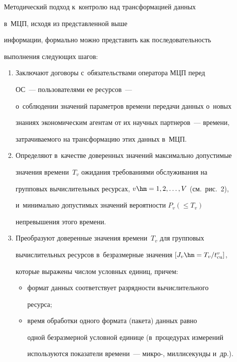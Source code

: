   

  Методический подход к~контролю над трансформацией данных 

в~МЦП, исходя из пред\-став\-лен\-ной выше 

информации, формально мож\-но пред\-ста\-вить как по\-сле\-до\-ва\-тель\-ность 

выполнения сле\-ду\-ющих ша\-гов:

  \begin{enumerate}[1.]

\item Заключают договоры с~обязательствами оператора МЦП перед 

ОС~--- пользователями ее ресурсов~--- 

о~соблюдении значений па\-ра\-мет\-ров времени передачи данных о~новых 

знаниях экономическим агентам от их научных партнеров~--- времени, 

за\-тра\-чи\-ва\-емо\-го на трансформацию этих данных в~МЦП.

\item Определяют в~качестве доверенных значений максимально до\-пус\-ти\-мые 

значения времени~$T_v$ ожидания требованиями обслуживания на 

групповых вы\-чис\-ли\-тель\-ных ресурсах, $v\hm=1, 2, \ldots, V$ (см.\ рис.~2), 

и~минимально до\-пус\-ти\-мых значений ве\-ро\-ят\-ности $P_v(\leq T_v)$ 

непревышения этого вре\-мени.

\item Преобразуют доверенные значения времени~$T_v$ для групповых 

вы\-чис\-ли\-тель\-ных ресурсов в~без\-раз\-мер\-ные значения $[J_v \hm= T_v/t^v_{\mathrm{cu}}]$, 

которые выражены чис\-лом услов\-ных единиц, при\-чем:

\begin{itemize}

\item формат данных соответствует раз\-ряд\-ности вы\-чис\-ли\-тель\-но\-го 

ресурса;

\item время обработки одного формата (пакета) данных рав\-но  

одной безразмерной услов\-ной единице (в~процедурах измерений 

используются показатели времени~--- мик\-ро-, мил\-ли\-се\-кун\-ды и~др.). 


\end{itemize}
\end{enumerate}
